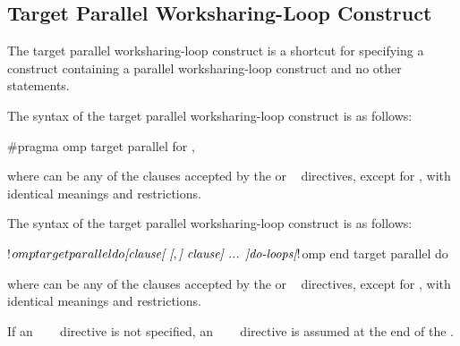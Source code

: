 
\subsection{Target Parallel Worksharing-Loop Construct}
\label{subsec:Target Parallel Worksharing-Loop Construct}
\summary
The target parallel worksharing-loop construct is a shortcut for specifying a 
construct containing a parallel worksharing-loop construct and no other statements.

\syntax
\begin{ccppspecific}
The syntax of the target parallel worksharing-loop construct is as follows:

\begin{ompcPragma}
#pragma omp target parallel for \plc{[clause[ [},\plc{] clause] ... ] new-line}
\end{ompcPragma}

where  can be any of the clauses accepted by the  or
~ directives, except for , with identical meanings and restrictions.
\end{ccppspecific}

\begin{fortranspecific}
The syntax of the target parallel worksharing-loop construct is as follows:

\begin{ompfPragma}
!$omp target parallel do \plc{[clause[ [},\plc{] clause] ... ]}
    \plc{do-loops}
\plc{[}!$omp end target parallel do\plc{]}
\end{ompfPragma}

where  can be any of the clauses accepted by the  or
~ directives, except for , with identical meanings and restrictions.

If an ~~~ directive is not specified, an
~~~ directive is assumed at the end of
the .
\end{fortranspecific}

